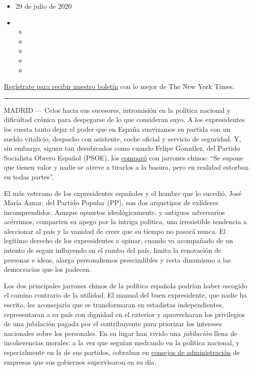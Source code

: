 \begin{itemize}
\item
  29 de julio de 2020
\item
  \begin{itemize}
  \item
  \item
  \item
  \item
  \item
  \end{itemize}
\end{itemize}

\href{https://www.nytimes3xbfgragh.onion/newsletters/el-times}{Regístrate
para recibir nuestro boletín} con lo mejor de The New York Times.

\begin{center}\rule{0.5\linewidth}{\linethickness}\end{center}

MADRID --- Celos hacia sus sucesores, intromisión en la política
nacional y dificultad crónica para despegarse de lo que consideran suyo.
A los expresidentes les cuesta tanto dejar el poder que en España
suavizamos su partida con un sueldo vitalicio, despacho con asistente,
coche oficial y servicio de seguridad. Y, sin embargo, siguen tan
desubicados como cuando Felipe González, del Partido Socialista Obrero
Español (PSOE), los
\href{https://www.lavozdegalicia.es/noticia/espana/2016/06/03/dos-jarrones-chinos-estorban-partidos-suman-votos/0003_201606G3P18993.htm}{comparó}
con jarrones chinos: ``Se supone que tienen valor y nadie se atreve a
tirarlos a la basura, pero en realidad estorban en todas partes''.

El más veterano de los expresidentes españoles y el hombre que lo
sucedió, José María Aznar, del Partido Popular (PP), son dos arquetipos
de exlíderes incomprendidos. Aunque opuestos ideológicamente, y antiguos
adversarios acérrimos, comparten su apego por la intriga política, una
irresistible tendencia a aleccionar al país y la vanidad de creer que su
tiempo no pasará nunca. El legítimo derecho de los expresidentes a
opinar, cuando va acompañado de un intento de seguir influyendo en el
rumbo del país, limita la renovación de personas e ideas, alarga
personalismos prescindibles y resta dinamismo a las democracias que los
padecen.

Los dos principales jarrones chinos de la política española podrían
haber escogido el camino contrario de la utilidad. El manual del buen
expresidente, que nadie ha escrito, les aconsejaría que se transformaran
en estadistas independientes, representaran a su país con dignidad en el
exterior y aprovecharan los privilegios de una jubilación pagada por el
contribuyente para priorizar los intereses nacionales sobre los
personales. En su lugar han vivido una \emph{jubilación} llena de
incoherencias morales: a la vez que seguían medrando en la política
nacional, y especialmente en la de sus partidos, cobraban en
\href{https://www.abc.es/espana/20150729/abci-trabajos-presidentes-espana-zapatero-201507281742.html}{consejos
de administración} de empresas que sus gobiernos supervisaron en su día.

